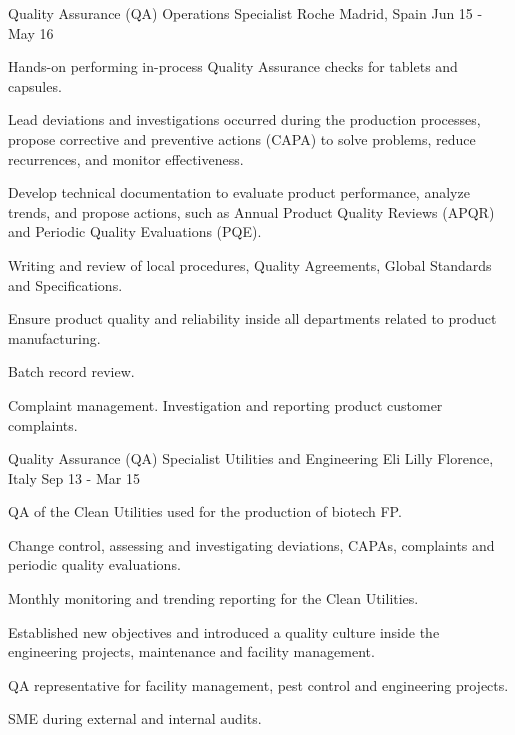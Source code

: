 \begin{cventries}
\cventry
    {Quality Assurance (QA) Operations Specialist} %
    {Roche} %
    {Madrid, Spain} %
    {Jun 15 - May 16} %
    {
        \begin{cvitems} %
            \item {Hands-on performing in-process Quality Assurance checks for tablets and capsules.}
            \item {Lead deviations and investigations occurred during the production processes, propose corrective and preventive actions (CAPA) to solve problems, reduce recurrences, and monitor effectiveness.}
            \item {Develop technical documentation to evaluate product performance, analyze trends, and propose actions, such as Annual Product Quality Reviews (APQR) and Periodic Quality Evaluations (PQE).}
            \item {Writing and review of local procedures, Quality Agreements, Global Standards and Specifications.}
            \item {Ensure product quality and reliability inside all departments related to product manufacturing.}
            \item {Batch record review.}
            \item {Complaint management. Investigation and reporting product customer complaints.}
        \end{cvitems}
    }

\cventry
    {Quality Assurance (QA) Specialist Utilities and Engineering} %
    {Eli Lilly} %
    {Florence, Italy} %
    {Sep 13 - Mar 15} %
    {
        \begin{cvitems} %
            \item {QA of the Clean Utilities used for the production of biotech FP.}
            \item {Change control, assessing and investigating deviations, CAPAs, complaints and periodic quality evaluations.}
            \item {Monthly monitoring and trending reporting for the Clean Utilities.}
            \item {Established new objectives and introduced a quality culture inside the engineering projects, maintenance and facility management.}
            \item {QA representative for facility management, pest control and engineering projects.}
            \item {SME during external and internal audits.}
        \end{cvitems}
    }


\end{cventries}
